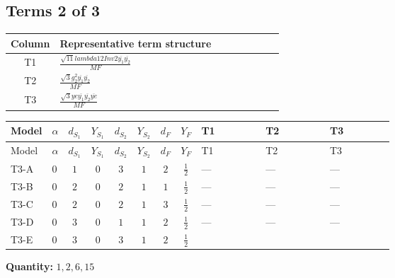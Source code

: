 \documentclass[8pt]{article}
\begin{document}
\begin{landscape}
\subsection*{Terms 2 of 3}
\begin{center}
\begin{tabular}{@{}c >{\raggedright\arraybackslash}p{0.82\linewidth}@{}}
\toprule
Column & Representative term structure \\
\midrule
T1 & \(\displaystyle \frac{\sqrt{11} lambda12Inv2 \overline{y_{1}} \overline{y_{2}}}{MF}\) \\
\midrule
T2 & \(\displaystyle \frac{\sqrt{3} g_{2}^{2} \overline{y_{1}} \overline{y_{2}}}{MF}\) \\
\midrule
T3 & \(\displaystyle \frac{\sqrt{3} ye \overline{y_{1}} \overline{y_{2}} \overline{ye}}{MF}\) \\
\midrule
\bottomrule
\end{tabular}
\end{center}
\smallskip
\tiny
\begin{longtable}{@{}llcccccc >{\raggedright\arraybackslash}p{0.21\linewidth} >{\raggedright\arraybackslash}p{0.21\linewidth} >{\raggedright\arraybackslash}p{0.21\linewidth}@{}}
\toprule
Model & $\alpha$ & $d_{S_1}$ & $Y_{S_1}$ & $d_{S_2}$ & $Y_{S_2}$ & $d_F$ & $Y_F$ & T1 & T2 & T3 \\
\midrule
\endfirsthead
\toprule
Model & $\alpha$ & $d_{S_1}$ & $Y_{S_1}$ & $d_{S_2}$ & $Y_{S_2}$ & $d_F$ & $Y_F$ & T1 & T2 & T3 \\
\midrule
\endhead
T3-A & $0$ & $1$ & $0$ & $3$ & $1$ & $2$ & $\frac{1}{2}$ & --- & --- & --- \\
\midrule
T3-B & $0$ & $2$ & $0$ & $2$ & $1$ & $1$ & $\frac{1}{2}$ & --- & --- & --- \\
\midrule
T3-C & $0$ & $2$ & $0$ & $2$ & $1$ & $3$ & $\frac{1}{2}$ & --- & --- & --- \\
\midrule
T3-D & $0$ & $3$ & $0$ & $1$ & $1$ & $2$ & $\frac{1}{2}$ & --- & --- & --- \\
\midrule
T3-E & $0$ & $3$ & $0$ & $3$ & $1$ & $2$ & $\frac{1}{2}$ & \scriptsize\adjustbox{max width=\linewidth}{$\begin{gathered} \frac{3 \sqrt{11} lambda12Inv2 \overline{y_{1}} \overline{y_{2}}}{22 MF}\end{gathered}$} & \scriptsize\adjustbox{max width=\linewidth}{$\begin{gathered} \frac{15 \sqrt{3} g_{2}^{2} \overline{y_{1}} \overline{y_{2}}}{8 MF}\end{gathered}$} & \scriptsize\adjustbox{max width=\linewidth}{$\begin{gathered} - \frac{\sqrt{3} ye \overline{y_{1}} \overline{y_{2}} \overline{ye}}{12 MF}\end{gathered}$} \\
\midrule
\bottomrule
\end{longtable}
\clearpage
\noindent\textbf{Quantity: }$\mathrm{1,2,6,15}$\par\smallskip

\end{landscape}
\end{document}
